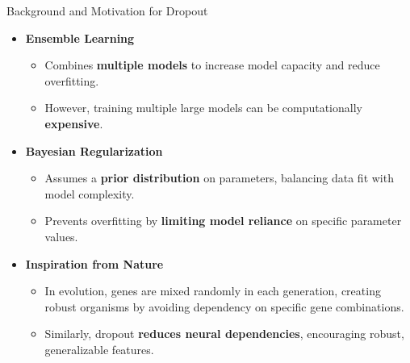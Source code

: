 \documentclass[serif, aspectratio=169]{beamer}
\begin{document}
\begin{frame}{Background and Motivation for Dropout}
    \begin{itemize}
        \item \textbf{Ensemble Learning}
            \begin{itemize}
                \item Combines \textbf{multiple models} to increase model capacity and reduce overfitting.
                \item However, training multiple large models can be computationally \textbf{expensive}.
            \end{itemize}
        \item \textbf{Bayesian Regularization}
            \begin{itemize}
                \item Assumes a \textbf{prior distribution} on parameters, balancing data fit with model complexity.
                \item Prevents overfitting by \textbf{limiting model reliance} on specific parameter values.
            \end{itemize}
        \item \textbf{Inspiration from Nature}
            \begin{itemize}
                \item In evolution, genes are mixed randomly in each generation, creating robust organisms by avoiding dependency on specific gene combinations.
                \item Similarly, dropout \textbf{reduces neural dependencies}, encouraging robust, generalizable features.
            \end{itemize}
    \end{itemize}
\end{frame}
\end{document}
